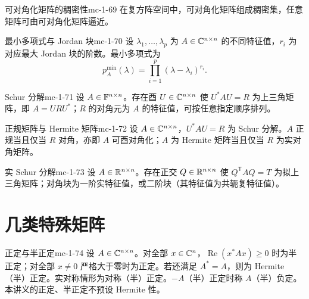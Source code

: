 \begin{corollary}{可对角化矩阵的稠密性}{mc-1-69}
在复方阵空间中，可对角化矩阵组成稠密集，任意矩阵可由可对角化矩阵逼近。
\end{corollary}

\begin{theorem}{最小多项式与 Jordan 块}{mc-1-70}
设 $\lambda_1,\ldots,\lambda_p$ 为 $A\in\mathbb{C}^{n\times n}$ 的不同特征值，$r_i$ 为对应最大 Jordan 块的阶数。最小多项式为
\[p_A^{\min}(\lambda)=\prod_{i=1}^p(\lambda-\lambda_i)^{r_i}.\]
\end{theorem}

\begin{theorem}{Schur 分解}{mc-1-71}
设 $A\in\mathbb{F}^{n\times n}$。存在酉 $U\in\mathbb{C}^{n\times n}$ 使 $U^*AU=R$ 为上三角矩阵，即 $A=URU^*$；$R$ 的对角元为 $A$ 的特征值，可按任意指定顺序排列。
\end{theorem}

\begin{corollary}{正规矩阵与 Hermite 矩阵}{mc-1-72}
设 $A\in\mathbb{C}^{n\times n}$，$U^*AU=R$ 为 Schur 分解。$A$ 正规当且仅当 $R$ 对角，亦即 $A$ 可酉对角化；$A$ 为 Hermite 矩阵当且仅当 $R$ 为实对角矩阵。
\end{corollary}

\begin{theorem}{实 Schur 分解}{mc-1-73}
设 $A\in\mathbb{R}^{n\times n}$。存在正交 $Q\in\mathbb{R}^{n\times n}$ 使 $Q^{\mathsf T}AQ=T$ 为拟上三角矩阵；对角块为一阶实特征值，或二阶块（其特征值为共轭复特征值）。
\end{theorem}

\section{几类特殊矩阵}

\begin{definition}{正定与半正定}{mc-1-74}
设 $A\in\mathbb{C}^{n\times n}$。对全部 $x\in\mathbb{C}^n$，$\operatorname{Re}(x^*Ax)\geq0$ 时为半正定；对全部 $x\ne0$ 严格大于零时为正定。若还满足 $A^*=A$，则为 Hermite（半）正定。实对称情形为对称（半）正定。$-A$（半）正定时称 $A$（半）负定。本讲义的正定、半正定不预设 Hermite 性。
\end{definition}

